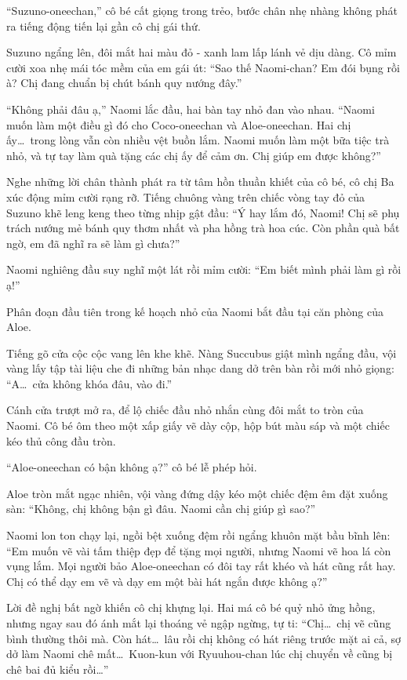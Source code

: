 ﻿\documentclass[../main.tex]{subfiles}
\begin{document}
``Suzuno-oneechan,'' cô bé cất giọng trong trẻo, bước chân nhẹ nhàng không phát ra tiếng động tiến lại gần cô chị gái thứ.

Suzuno ngẩng lên, đôi mắt hai màu đỏ - xanh lam lấp lánh vẻ dịu dàng. Cô mỉm cười xoa nhẹ mái tóc mềm của em gái út: ``Sao thế Naomi-chan? Em đói bụng rồi à? Chị đang chuẩn bị chút bánh quy nướng đây.''

``Không phải đâu ạ,'' Naomi lắc đầu, hai bàn tay nhỏ đan vào nhau. ``Naomi muốn làm một điều gì đó cho Coco-oneechan và Aloe-oneechan. Hai chị ấy\dots\ trong lòng vẫn còn nhiều vệt buồn lắm. Naomi muốn làm một bữa tiệc trà nhỏ, và tự tay làm quà tặng các chị ấy để cảm ơn. Chị giúp em được không?''

Nghe những lời chân thành phát ra từ tâm hồn thuần khiết của cô bé, cô chị Ba xúc động mỉm cười rạng rỡ. Tiếng chuông vàng trên chiếc vòng tay đỏ của Suzuno khẽ leng keng theo từng nhịp gật đầu: ``Ý hay lắm đó, Naomi! Chị sẽ phụ trách nướng mẻ bánh quy thơm nhất và pha hồng trà hoa cúc. Còn phần quà bất ngờ, em đã nghĩ ra sẽ làm gì chưa?''

Naomi nghiêng đầu suy nghĩ một lát rồi mỉm cười: ``Em biết mình phải làm gì rồi ạ!''

\ct

Phân đoạn đầu tiên trong kế hoạch nhỏ của Naomi bắt đầu tại căn phòng của Aloe.

Tiếng gõ cửa cộc cộc vang lên khe khẽ. Nàng Succubus giật mình ngẩng đầu, vội vàng lấy tập tài liệu che đi những bản nhạc dang dở trên bàn rồi mới nhỏ giọng: ``A\dots\ cửa không khóa đâu, vào đi.''

Cánh cửa trượt mở ra, để lộ chiếc đầu nhỏ nhắn cùng đôi mắt to tròn của Naomi. Cô bé ôm theo một xấp giấy vẽ dày cộp, hộp bút màu sáp và một chiếc kéo thủ công đầu tròn.

``Aloe-oneechan có bận không ạ?'' cô bé lễ phép hỏi.

Aloe tròn mắt ngạc nhiên, vội vàng đứng dậy kéo một chiếc đệm êm đặt xuống sàn: ``Không, chị không bận gì đâu. Naomi cần chị giúp gì sao?''

Naomi lon ton chạy lại, ngồi bệt xuống đệm rồi ngẩng khuôn mặt bầu bĩnh lên: ``Em muốn vẽ vài tấm thiệp đẹp để tặng mọi người, nhưng Naomi vẽ hoa lá còn vụng lắm. Mọi người bảo Aloe-oneechan có đôi tay rất khéo và hát cũng rất hay. Chị có thể dạy em vẽ và dạy em một bài hát ngắn được không ạ?''

Lời đề nghị bất ngờ khiến cô chị khựng lại. Hai má cô bé quỷ nhỏ ửng hồng, nhưng ngay sau đó ánh mắt lại thoáng vẻ ngập ngừng, tự ti: ``Chị\dots\ chị vẽ cũng bình thường thôi mà. Còn hát\dots\ lâu rồi chị không có hát riêng trước mặt ai cả, sợ dở làm Naomi chê mất\dots\ Kuon-kun với Ryuuhou-chan lúc chị chuyển về cũng bị chê bai đủ kiểu rồi\dots''
\end{document}
